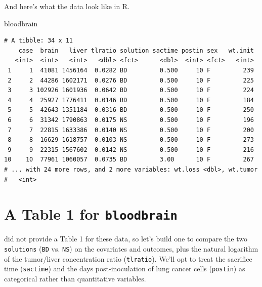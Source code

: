 \documentclass[]{book}
\newenvironment{Shaded}{\begin{snugshade}}{\end{snugshade}}
\newcommand{\KeywordTok}[1]{\textcolor[rgb]{0.13,0.29,0.53}{\textbf{#1}}}
\newcommand{\DataTypeTok}[1]{\textcolor[rgb]{0.13,0.29,0.53}{#1}}
\newcommand{\StringTok}[1]{\textcolor[rgb]{0.31,0.60,0.02}{#1}}
\newcommand{\OperatorTok}[1]{\textcolor[rgb]{0.81,0.36,0.00}{\textbf{#1}}}
\newcommand{\NormalTok}[1]{#1}
\theoremstyle{definition}
\theoremstyle{definition}
\theoremstyle{definition}
\theoremstyle{remark}
\begin{document}
And here's what the data look like in R.

\begin{Shaded}
\begin{Highlighting}[]
\NormalTok{bloodbrain}
\end{Highlighting}
\end{Shaded}

\begin{verbatim}
# A tibble: 34 x 11
    case  brain   liver tlratio solution sactime postin sex   wt.init
   <int>  <int>   <int>   <dbl> <fct>      <dbl>  <int> <fct>   <int>
 1     1  41081 1456164  0.0282 BD         0.500     10 F         239
 2     2  44286 1602171  0.0276 BD         0.500     10 F         225
 3     3 102926 1601936  0.0642 BD         0.500     10 F         224
 4     4  25927 1776411  0.0146 BD         0.500     10 F         184
 5     5  42643 1351184  0.0316 BD         0.500     10 F         250
 6     6  31342 1790863  0.0175 NS         0.500     10 F         196
 7     7  22815 1633386  0.0140 NS         0.500     10 F         200
 8     8  16629 1618757  0.0103 NS         0.500     10 F         273
 9     9  22315 1567602  0.0142 NS         0.500     10 F         216
10    10  77961 1060057  0.0735 BD         3.00      10 F         267
# ... with 24 more rows, and 2 more variables: wt.loss <dbl>, wt.tumor
#   <int>
\end{verbatim}

\section{\texorpdfstring{A Table 1 for
\texttt{bloodbrain}}{A Table 1 for bloodbrain}}\label{a-table-1-for-bloodbrain}

\citet{Barnett1995} did not provide a Table 1 for these data, so let's
build one to compare the two \texttt{solutions} (\texttt{BD} vs.
\texttt{NS}) on the covariates and outcomes, plus the natural logarithm
of the tumor/liver concentration ratio (\texttt{tlratio}). We'll opt to
treat the sacrifice time (\texttt{sactime}) and the days
post-inoculation of lung cancer cells (\texttt{postin}) as categorical
rather than quantitative variables.

\begin{Shaded}
\end{Shaded}
\end{document}
